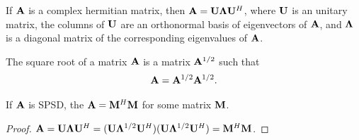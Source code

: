 \begin{theorem}{}{}
    If $\bold{A}$ is a complex hermitian matrix, then $\bold{A}=\bold{U}\bold{\Lambda}\bold{U}^H$,
    where $\bold{U}$ is an unitary matrix, the columns of $\bold{U}$ are an orthonormal basis of eigenvectors of $\bold{A}$,
    and $\bold{\Lambda}$ is a diagonal matrix of the corresponding eigenvalues of $\bold{A}$.
\end{theorem}

\begin{definition}{}{}
    The square root of a matrix $\bold{A}$ is a matrix $\bold{A}^{1/2}$ such that
    \begin{align*}
        \bold{A}=\bold{A}^{1/2}\bold{A}^{1/2}.
    \end{align*}
\end{definition}

\begin{proposition}{}{}
    If $\bold{A}$ is SPSD, the $\bold{A}=\bold{M}^H\bold{M}$ for some matrix $\bold{M}$.
\end{proposition}

\begin{proof}
    $\bold{A}=\bold{U}\bold{\Lambda}\bold{U}^H=(\bold{U}\bold{\Lambda}^{1/2}\bold{U}^H)(\bold{U}\bold{\Lambda}^{1/2}\bold{U}^H)=\bold{M}^H\bold{M}$.
\end{proof}

